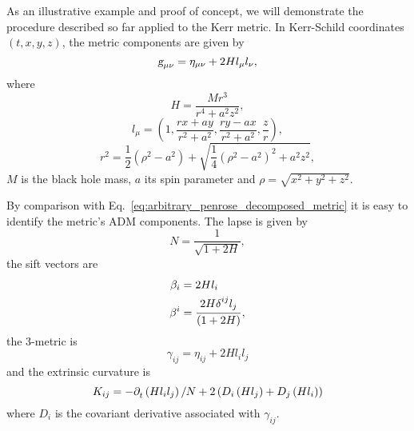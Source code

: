 As an illustrative example and proof of concept, we will demonstrate the procedure described so far applied to the Kerr metric. In Kerr-Schild coordinates $(t,x,y,z)$, the metric components are given by~\cite{PhysRevD.66.084024}
%
\begin{equation}
  \mtrtens{\mu}{\nu} = \eta_{\mu \nu} + 2 H l_\mu l_\nu,
  \label{eq:arbitrary_penrose_kerr_ks_line_element}
\end{equation}
%
where
%
\begin{equation}
  H = \frac{M r^3}{r^4 + a^2 z^2},
  \label{eq:arbitrary_penrose_kerr_ks_H}
\end{equation}
%
\begin{equation}
  l_\mu = \left( 1, \frac{rx + ay}{r^2 + a^2}, \frac{ry - ax}{r^2 + a^2}, \frac{z}{r} \right),
  \label{eq:arbitrary_penrose_kerr_ks_l}
\end{equation}
%
\begin{equation}
  r^2 = \frac{1}{2}\left( \rho^2 - a^2 \right) + \sqrt{\frac{1}{4} \left( \rho^2 - a^2 \right)^2 + a^2z^2},
  \label{eq:arbitrary_penrose_kerr_ks_r}
\end{equation}
%
$M$ is the black hole mass, $a$ its spin parameter and $\rho = \sqrt{x^2 + y^2 + z^2}$.

By comparison with Eq.~\eqref{eq:arbitrary_penrose_decomposed_metric} it is easy to identify the metric's ADM components. The lapse is given by~\cite{PhysRevD.66.084024}
%
\begin{equation}
  N = \frac{1}{\sqrt{1 + 2 H}},
  \label{eq:arbitrary_penrose_kerr_ks_lapse}
\end{equation}
%
the sift vectors are
%
\begin{align}
  \beta_i & = 2 H l_i \label{eq:arbitrary_penrose_kerr_ks_l_shift}                                                      \\
  \beta^i & = \frac{2 H \tens{\delta}{ij}{} l_j }{\left( 1 + 2 H \right)}, \label{eq:arbitrary_penrose_kerr_ks_u_shift}
\end{align}
%
the 3-metric is
%
\begin{equation}
  \gamma_{ij} = \eta_{ij} + 2 H l_i l_j
  \label{eq:arbitrary_penrose_kerr_ks_3_metric}
\end{equation}
%
and the extrinsic curvature is
%
\begin{equation}
  K_{ij} = -\indexdel{t}\left( H l_i l_j \right)/N + 2 \left( D_i \left( H l_j \right) + D_j \left( H l_i \right) \right)
  \label{eq:arbitrary_penrose_kerr_ks_3_extrinsic_curvature}
\end{equation}
%
where $D_i$ is the covariant derivative associated with $\gamma_{ij}$.

